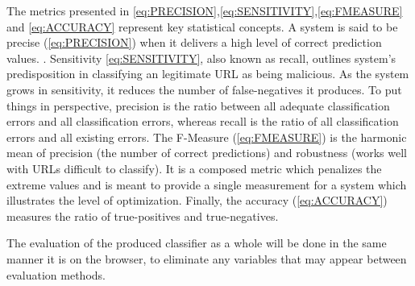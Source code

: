 The metrics presented in \ref{eq:PRECISION},\ref{eq:SENSITIVITY},\ref{eq:FMEASURE} and \ref{eq:ACCURACY} represent key statistical concepts. A system is said to be precise (\ref{eq:PRECISION}) when it delivers a high level of correct prediction values. . Sensitivity \ref{eq:SENSITIVITY}, also known as recall, outlines system's predisposition in classifying an legitimate URL as being malicious. As the system grows in sensitivity, it reduces the number of false-negatives it produces. To put things in perspective, precision is the ratio between all adequate classification errors and all classification errors, whereas recall is the ratio of all classification errors and all existing errors.
The F-Measure (\ref{eq:FMEASURE}) is the harmonic mean of precision (the number of correct predictions) and robustness (works well with URLs difficult to classify). It is a composed metric which penalizes the extreme values and is meant to provide a single measurement for a system which illustrates the level of optimization. Finally, the accuracy (\ref{eq:ACCURACY}) measures the ratio of true-positives and true-negatives.

The evaluation of the produced classifier as a whole will be done in the same manner it is on the browser, to eliminate any variables that may appear between evaluation methods.

\iffalse
1st module Whitelist/Blacklist
		Hash urls and do lookups as cheap as possible
2nd module Heuristics
		Compile a set of heuristics from the papers based on performance
3rd module Visual similarity/Content evaluation
		Think about studying the visual similarity or some content evaluation if feasible
4th module Machine learning
		use Cohen's kappa static to measure agreement between stacked machine learning algos
		URL classifier (supervised learning)
		Domain classifier (trained with https://github.com/elceef/dnstwist)
		DGA classifier (optional)

Figures must be correctly numbered with captions and paragraph text should not be wrapped around figures - same rules apply to tables. An example of figures can be found below.
\begin{figure}[t]
	\centering
	\texttt{[image: unilogo.jpg]}
	\caption{Bournemouth University}
	\label{fig:BULogo3}
\end{figure}
You should always start with an overview (Heading 2 style) to tell what this chapter is about and finkish with a summary (Heading 2 style) to tell what has been covered in this chapter.

This chapter is about discussing your project planning and methodology. Note that your chosen methodology should be based on the constraints and complexity of your project instead of some common senses with no link to your own project.]
\fi